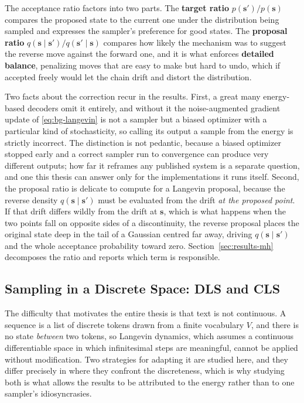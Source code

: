 The acceptance ratio factors into two parts. The \textbf{target ratio} $p(\bm{s}')/p(\bm{s})$ compares the proposed state to the current one under the distribution being sampled and expresses the sampler's preference for good states. The \textbf{proposal ratio} $q(\bm{s} \mid \bm{s}')/q(\bm{s}' \mid \bm{s})$ compares how likely the mechanism was to suggest the reverse move against the forward one, and it is what enforces \textbf{detailed balance}, penalizing moves that are easy to make but hard to undo, which if accepted freely would let the chain drift and distort the distribution.

Two facts about the correction recur in the results. First, a great many energy-based decoders omit it entirely, and without it the noise-augmented gradient update of \eqref{eq:bg-langevin} is not a sampler but a biased optimizer with a particular kind of stochasticity, so calling its output a sample from the energy is strictly incorrect. The distinction is not pedantic, because a biased optimizer stopped early and a correct sampler run to convergence can produce very different outputs; how far it reframes any published system is a separate question, and one this thesis can answer only for the implementations it runs itself. Second, the proposal ratio is delicate to compute for a Langevin proposal, because the reverse density $q(\bm{s} \mid \bm{s}')$ must be evaluated from the drift \emph{at the proposed point}. If that drift differs wildly from the drift at $\bm{s}$, which is what happens when the two points fall on opposite sides of a discontinuity, the reverse proposal places the original state deep in the tail of a Gaussian centred far away, driving $q(\bm{s} \mid \bm{s}')$ and the whole acceptance probability toward zero. Section~\ref{sec:results-mh} decomposes the ratio and reports which term is responsible.

\subsection{Sampling in a Discrete Space: DLS and CLS}
\label{sec:bg-samplers}

The difficulty that motivates the entire thesis is that text is not continuous. A sequence is a list of discrete tokens drawn from a finite vocabulary $V$, and there is no state \emph{between} two tokens, so Langevin dynamics, which assumes a continuous differentiable space in which infinitesimal steps are meaningful, cannot be applied without modification. Two strategies for adapting it are studied here, and they differ precisely in where they confront the discreteness, which is why studying both is what allows the results to be attributed to the energy rather than to one sampler's idiosyncrasies.

